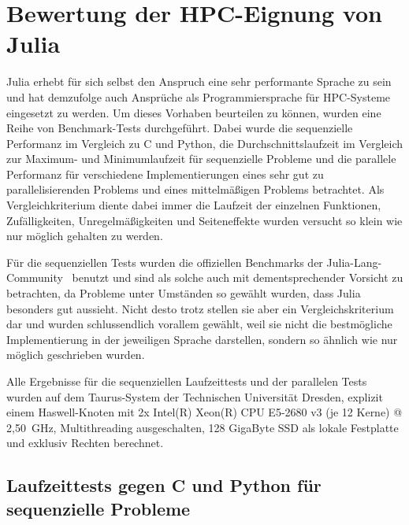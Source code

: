 \documentclass[proseminar,german,utf8]{zihpub}
\begin{document}
\section{Bewertung der HPC-Eignung von Julia}
Julia erhebt für sich selbst den Anspruch eine sehr performante Sprache zu sein und hat demzufolge auch Ansprüche als Programmiersprache für HPC-Systeme eingesetzt zu werden. Um dieses Vorhaben beurteilen zu können, wurden eine Reihe von Benchmark-Tests durchgeführt. Dabei wurde die sequenzielle Performanz im Vergleich zu C und Python, die Durchschnittslaufzeit im Vergleich zur Maximum- und Minimumlaufzeit für sequenzielle Probleme und die parallele Performanz für verschiedene Implementierungen eines sehr gut zu parallelisierenden Problems und eines mittelmäßigen Problems betrachtet. Als Vergleichkriterium diente dabei immer die Laufzeit der einzelnen Funktionen, Zufälligkeiten, Unregelmäßigkeiten und Seiteneffekte wurden versucht so klein wie nur möglich gehalten zu werden. 

Für die sequenziellen Tests wurden die offiziellen Benchmarks der Julia-Lang-Community~\cite{JuliaMicroBenchmarks} benutzt und sind als solche auch mit dementsprechender Vorsicht zu betrachten, da Probleme unter Umständen so gewählt wurden, dass Julia besonders gut aussieht. Nicht desto trotz stellen sie aber ein Vergleichskriterium dar und wurden schlussendlich vorallem gewählt, weil sie nicht die bestmögliche Implementierung in der jeweiligen Sprache darstellen, sondern so ähnlich wie nur möglich geschrieben wurden. 

Alle Ergebnisse für die sequenziellen Laufzeittests und der parallelen Tests wurden auf dem Taurus-System der Technischen Universität Dresden, explizit einem Haswell-Knoten mit 2x Intel(R) Xeon(R) CPU E5-2680 v3 (je 12 Kerne) @ 2,50~GHz, Multithreading ausgeschalten, 128 GigaByte SSD als lokale Festplatte und exklusiv Rechten berechnet. 

\subsection{Laufzeittests gegen C und Python für sequenzielle Probleme}
\end{document}
